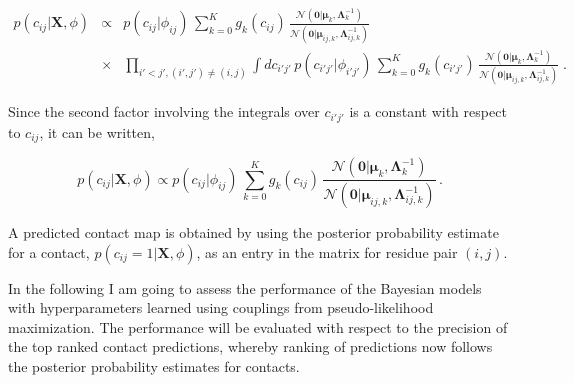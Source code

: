 \documentclass[11pt,a4paper,twoside]{book}
\newcommand{\eq}{\!=\!}
\newcommand{\Gauss}{\mathcal{N}}
\newcommand{\Lijk}{\mathbf{\Lambda}_{ij,k}}
\newcommand{\Lk}{\mathbf{\Lambda}_k}
\newcommand{\muijk}{\mathbf{\mu}_{ij,k}}
\newcommand{\muk}{\mathbf{\mu}_k}
\newcommand{\cij}{c_{ij}}
\newcommand{\X}{\mathbf{X}}
\theoremstyle{definition}
\theoremstyle{definition}
\theoremstyle{remark}
\begin{document}
\begin{eqnarray}
    p(\cij | \X, \phi) & \propto & 
            p(\cij |\phi_{ij}) \, \sum_{k=0}^K g_{k}(\cij) \, \frac{\Gauss( \mathbf{0} | \muk, \Lk^{-1})}{\Gauss(\mathbf{0} | \muijk, \Lijk^{-1})} \nonumber\\
            & \times  & \prod_{i'<j', (i',j') \ne (i,j)} \int d c_{i'j'} \, p(c_{i'j'} |\phi_{i'j'}) \, \sum_{k=0}^K g_{k}(c_{i'j'}) \, \frac{\Gauss( \mathbf{0} | \muk, \Lk^{-1})}{\Gauss(\mathbf{0} | \muijk, \Lijk^{-1})} \; .
\end{eqnarray}

Since the second factor involving the integrals over \(c_{i'j'}\) is a
constant with respect to \(\cij\), it can be written,

\begin{equation}
    p(\cij | \X, \phi) \propto  p(\cij |\phi_{ij}) \,  \sum_{k=0}^K g_{k}(\cij) \, \frac{\Gauss( \mathbf{0} | \muk, \Lk^{-1})}{\Gauss(\mathbf{0} | \muijk, \Lijk^{-1})}  \, .
\label{eq:posterior-marginal-rij}
\end{equation}

A predicted contact map is obtained by using the posterior probability
estimate for a contact, \(p(\cij \eq 1| \X, \phi)\), as an entry in the
matrix for residue pair \((i,j)\).

In the following I am going to assess the performance of the Bayesian
models with hyperparameters learned using couplings from
pseudo-likelihood maximization. The performance will be evaluated with
respect to the precision of the top ranked contact predictions, whereby
ranking of predictions now follows the posterior probability estimates
for contacts.
\end{document}
